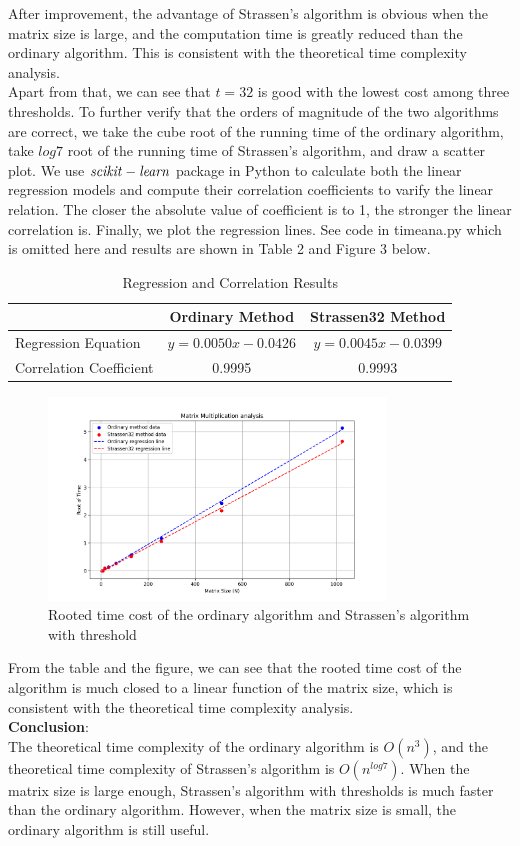 \documentclass[UTF8]{ctexart}
\begin{document}
After improvement, the advantage of Strassen's algorithm is obvious when the matrix size is large, and the computation time is greatly reduced than the ordinary algorithm. This is consistent with the theoretical time complexity analysis.\\
Apart from that, we can see that $t = 32$ is good with the lowest cost among three thresholds. To further verify that the orders of magnitude of the two algorithms are correct, we take the cube root of the running time of the ordinary algorithm,
take $log7$ root of the running time of Strassen's algorithm, and draw a scatter plot. We use $\it{scikit-learn}$ package in Python to calculate both the linear regression models and compute their correlation coefficients to varify the linear relation.
The closer the absolute value of coefficient is to 1, the stronger the linear correlation is. Finally, we plot the regression lines. See code in timeana.py which is omitted here and results are shown in Table 2 and Figure 3 below.\\
\begin{table}[h!]
    \centering
    \caption{Regression and Correlation Results}
    \begin{tabular}{lcc}
    \hline
    & \textbf{Ordinary Method} & \textbf{Strassen32 Method} \\
    \hline
    Regression Equation & $y = 0.0050x - 0.0426$ & $y = 0.0045x - 0.0399$ \\
    Correlation Coefficient & 0.9995 & 0.9993 \\
    \hline
    \end{tabular}
\end{table}
\medskip
\begin{figure}[H]
    \centering
    \includegraphics[width=0.8\textwidth]{complexity_analysis.png}
    \caption{Rooted time cost of the ordinary algorithm and Strassen's algorithm with threshold}
\end{figure}
From the table and the figure, we can see that the rooted time cost of the algorithm is much closed to a linear function of the matrix size, which is consistent with the theoretical time complexity analysis.\\
\textbf{Conclusion}:\\
The theoretical time complexity of the ordinary algorithm is $O(n^3)$, and the theoretical time complexity of Strassen's algorithm is $O(n^{log7})$. When the matrix size is large enough, Strassen's algorithm with thresholds is much faster than the ordinary algorithm.
However, when the matrix size is small, the ordinary algorithm is still useful.\\
\end{document}
